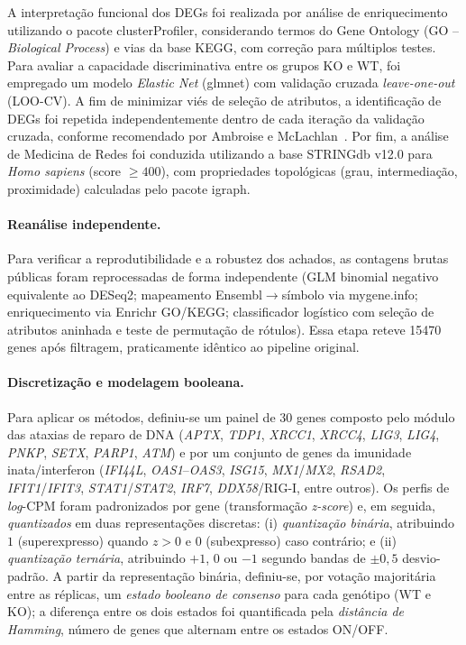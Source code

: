 \documentclass[10pt,letterpaper]{article}
\newcommand{\gene}[1]{\textit{#1}}
\begin{document}
A interpretação funcional dos DEGs foi realizada por análise de enriquecimento
utilizando o pacote \textsf{clusterProfiler}, considerando termos do
Gene Ontology (GO -- \emph{Biological Process}) e vias da base KEGG, com
correção para múltiplos testes. Para avaliar a capacidade discriminativa entre
os grupos KO e WT, foi empregado um modelo \emph{Elastic Net}
(\textsf{glmnet}) com validação cruzada \emph{leave-one-out} (LOO-CV). A fim de
minimizar viés de seleção de atributos, a identificação de DEGs foi repetida
independentemente dentro de cada iteração da validação cruzada, conforme
recomendado por Ambroise e McLachlan~\cite{Ambroise2002}. Por fim, a análise de
Medicina de Redes foi conduzida utilizando a base STRINGdb v12.0 para
\emph{Homo sapiens} (score \(\geq 400\)), com propriedades topológicas
(grau, intermediação, proximidade) calculadas pelo pacote \textsf{igraph}.

\paragraph{Reanálise independente.} Para verificar a reprodutibilidade e a
robustez dos achados, as contagens brutas públicas foram reprocessadas de forma
independente (GLM binomial negativo equivalente ao DESeq2; mapeamento
Ensembl\(\rightarrow\)símbolo via mygene.info; enriquecimento via Enrichr
GO/KEGG; classificador logístico com seleção de atributos aninhada e teste de
permutação de rótulos). Essa etapa reteve \num{15470} genes após filtragem,
praticamente idêntico ao pipeline original.

\paragraph{Discretização e modelagem booleana.} Para aplicar os métodos, definiu-se um painel de 30 genes composto pelo módulo das
ataxias de reparo de DNA (\gene{APTX}, \gene{TDP1}, \gene{XRCC1}, \gene{XRCC4},
\gene{LIG3}, \gene{LIG4}, \gene{PNKP}, \gene{SETX}, \gene{PARP1}, \gene{ATM}) e
por um conjunto de genes da imunidade inata/interferon (\gene{IFI44L},
\gene{OAS1}--\gene{OAS3}, \gene{ISG15}, \gene{MX1}/\gene{MX2}, \gene{RSAD2},
\gene{IFIT1}/\gene{IFIT3}, \gene{STAT1}/\gene{STAT2}, \gene{IRF7},
\gene{DDX58}/RIG-I, entre outros). Os perfis de \emph{log}-CPM foram
padronizados por gene (transformação \emph{z-score}) e, em seguida,
\emph{quantizados} em duas representações discretas: (i) \emph{quantização binária}, atribuindo \(1\) (superexpresso)
quando \(z>0\) e \(0\) (subexpresso) caso contrário; e (ii) \emph{quantização
ternária}, atribuindo \(+1\), \(0\) ou \(-1\) segundo bandas de
\(\pm 0{,}5\) desvio-padrão. A partir da representação binária, definiu-se, por
votação majoritária entre as réplicas, um \emph{estado booleano de consenso}
para cada genótipo (WT e KO); a diferença entre os dois estados foi quantificada
pela \emph{distância de Hamming}, número de genes que alternam entre os estados
ON/OFF.
\end{document}
